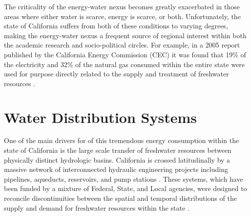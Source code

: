 The criticality of the energy-water nexus becomes greatly exacerbated in those areas where either water is scarce, energy is scarce, or both. Unfortunately, the state of California suffers from both of these conditions to varying degrees, making the energy-water nexus a frequent source of regional interest within both the academic research and socio-political circles. For example, in a 2005 report published by the California Energy Commission (CEC) it was found that 19\% of the electricity and 32\% of the natural gas consumed within the entire state were used for purpose directly related to the supply and treatment of freshwater resources \cite{Horvath2005}.
    
\section{Water Distribution Systems}
    
One of the main drivers for of this tremendous energy consumption within the state of California is the large scale transfer of freshwater resources between physically distinct hydrologic basins. California is crossed latitudinally by a massive network of interconnected hydraulic engineering projects including pipelines, aqueducts, reservoirs, and pump stations \cite{Schwarzenegger2005, Schwarzenegger2005}. These systems, which have been funded by a mixture of Federal, State, and Local agencies, were designed to reconcile discontinuities between the spatial and temporal distributions of the supply and demand for freshwater resources within the state \cite{Freeman2008}.

